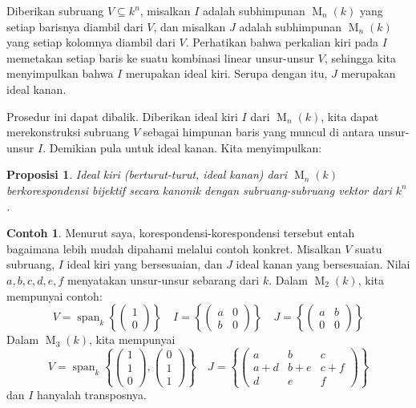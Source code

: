 \documentclass[12pt]{article}
\theoremstyle{plain}
\newtheorem{proposition}[theorem]{Proposisi}
\theoremstyle{definition}
\newtheorem{example}[theorem]{Contoh}
\theoremstyle{remark}
\numberwithin{equation}{section}
\begin{document}
Diberikan subruang $V \subseteq k^n$, misalkan
$I$ adalah subhimpunan $\operatorname{M}_n(k)$
yang setiap barisnya diambil dari $V$,
dan misalkan $J$ adalah subhimpunan $\operatorname{M}_n(k)$
yang setiap kolomnya diambil dari $V$.
Perhatikan bahwa perkalian kiri pada $I$ memetakan setiap baris ke suatu
kombinasi linear unsur-unsur $V$, sehingga kita menyimpulkan bahwa $I$ merupakan
ideal kiri. Serupa dengan itu, $J$ merupakan ideal kanan.

Prosedur ini dapat dibalik.
Diberikan ideal kiri $I$ dari $\operatorname{M}_n(k)$,
kita dapat merekonstruksi subruang $V$
sebagai himpunan baris yang muncul di antara unsur-unsur $I$.
Demikian pula untuk ideal kanan. Kita menyimpulkan:

\begin{proposition}
Ideal kiri (berturut-turut, ideal kanan) dari $\operatorname{M}_n(k)$
berkorespondensi bijektif secara kanonik dengan subruang-subruang vektor dari $k^n$.
\end{proposition}

\begin{example}
Menurut saya, korespondensi-korespondensi tersebut entah bagaimana lebih mudah dipahami
melalui contoh konkret. Misalkan $V$ suatu subruang,
$I$ ideal kiri yang bersesuaian, dan $J$ ideal kanan yang bersesuaian.
Nilai $a,b,c,d,e,f$ menyatakan unsur-unsur sebarang dari $k$.
Dalam $\operatorname{M}_2(k)$, kita mempunyai contoh:
\[
V = \operatorname{span}_k \left\{
\begin{pmatrix} 1 \\ 0 \end{pmatrix} \right\}
\quad
I = \left\{ \begin{pmatrix} a & 0 \\ b & 0 \end{pmatrix} \right\} 
\quad
J = \left\{ \begin{pmatrix} a & b \\ 0 & 0 \end{pmatrix} \right\}
\]
Dalam $\operatorname{M}_3(k)$, kita mempunyai
\[
V = \operatorname{span}_k \left\{
\begin{pmatrix} 1 \\ 1 \\ 0 \end{pmatrix},
\begin{pmatrix} 0 \\ 1 \\ 1 \end{pmatrix} \right\}
\quad
J = \left\{ \begin{pmatrix}
a & b & c \\
a+d & b+e & c+f \\
d & e & f
\end{pmatrix} \right\}
\]
dan $I$ hanyalah transposnya.
\end{example}
\end{document}
